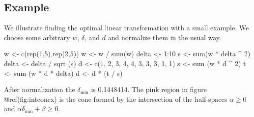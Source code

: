 \documentclass[
  12pt,
  letterpaper,
  DIV=11,
  numbers=noendperiod]{scrreprt}
\newenvironment{Shaded}{\begin{snugshade}}{\end{snugshade}}
\newcommand{\DecValTok}[1]{\textcolor[rgb]{0.68,0.00,0.00}{#1}}
\newcommand{\FunctionTok}[1]{\textcolor[rgb]{0.28,0.35,0.67}{#1}}
\newcommand{\NormalTok}[1]{\textcolor[rgb]{0.00,0.23,0.31}{#1}}
\newcommand{\OtherTok}[1]{\textcolor[rgb]{0.00,0.23,0.31}{#1}}
\newcommand{\SpecialCharTok}[1]{\textcolor[rgb]{0.37,0.37,0.37}{#1}}
\theoremstyle{remark}
\begin{document}
\subsection{Example}\label{example}

We illustrate finding the optimal linear transformation with a small
example. We choose some arbitrary \(w\), \(\delta\), and \(d\) and
normalize them in the usual way.

\begin{Shaded}
\begin{Highlighting}[]
\NormalTok{w }\OtherTok{\textless{}{-}} \FunctionTok{c}\NormalTok{(}\FunctionTok{rep}\NormalTok{(}\DecValTok{1}\NormalTok{,}\DecValTok{5}\NormalTok{),}\FunctionTok{rep}\NormalTok{(}\DecValTok{2}\NormalTok{,}\DecValTok{5}\NormalTok{))}
\NormalTok{w }\OtherTok{\textless{}{-}}\NormalTok{ w }\SpecialCharTok{/} \FunctionTok{sum}\NormalTok{(w)}
\NormalTok{delta }\OtherTok{\textless{}{-}} \DecValTok{1}\SpecialCharTok{:}\DecValTok{10}
\NormalTok{s }\OtherTok{\textless{}{-}} \FunctionTok{sum}\NormalTok{(w }\SpecialCharTok{*}\NormalTok{ delta }\SpecialCharTok{\^{}} \DecValTok{2}\NormalTok{)}
\NormalTok{delta }\OtherTok{\textless{}{-}}\NormalTok{ delta }\SpecialCharTok{/} \FunctionTok{sqrt}\NormalTok{ (s)}
\NormalTok{d }\OtherTok{\textless{}{-}} \FunctionTok{c}\NormalTok{(}\DecValTok{1}\NormalTok{, }\DecValTok{2}\NormalTok{, }\DecValTok{3}\NormalTok{, }\DecValTok{4}\NormalTok{, }\DecValTok{4}\NormalTok{, }\DecValTok{3}\NormalTok{, }\DecValTok{3}\NormalTok{, }\DecValTok{3}\NormalTok{, }\DecValTok{1}\NormalTok{, }\DecValTok{1}\NormalTok{)}
\NormalTok{s }\OtherTok{\textless{}{-}} \FunctionTok{sum}\NormalTok{ (w }\SpecialCharTok{*}\NormalTok{ d }\SpecialCharTok{\^{}} \DecValTok{2}\NormalTok{)}
\NormalTok{t }\OtherTok{\textless{}{-}} \FunctionTok{sum}\NormalTok{ (w }\SpecialCharTok{*}\NormalTok{ d }\SpecialCharTok{*}\NormalTok{ delta)}
\NormalTok{d }\OtherTok{\textless{}{-}}\NormalTok{ d }\SpecialCharTok{*}\NormalTok{ (t }\SpecialCharTok{/}\NormalTok{ s)}
\end{Highlighting}
\end{Shaded}

After normalization the \(\delta_{\text{min}}\) is 0.1448414. The pink
region in figure @ref(fig:intconex) is the cone formed by the
intersection of the half-spaces \(\alpha\geq 0\) and
\(\alpha\delta_{\text{min}}+\beta\geq 0\).
\end{document}
